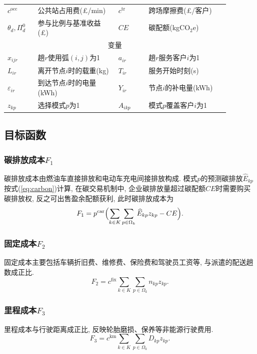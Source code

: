 \documentclass{setp-new}
\begin{document}
\begin{table}[H]
\begin{tabular}{@{}p{0.12\linewidth}p{0.32\linewidth}p{0.12\linewidth}p{0.32\linewidth}@{}}
$c^{\mathrm{occ}}$ & 公共站占用费(£/min) & $c^{\mathrm{tr}}$ & 跨场摩擦费(£/客户)\\
$\theta_d,\Pi_d^0$ & 参与比例与基准收益(£) & $CE$ & 碳配额(kgCO$_2$e)\\
\multicolumn{4}{c}{变量}\\
$x_{ijr}$ & 趟$r$使用弧$(i,j)$为1 & $a_{ir}$ & 趟$r$服务客户$i$为1\\
$L_{ir}$ & 离开节点$i$时的载重(kg) & $T_{ir}$ & 服务开始时刻(s)\\
$\varepsilon_{ir}$ & 到达节点$i$时的电量(kWh) & $Y_{ir}$ & 节点$i$的补电量(kWh)\\
$z_{kp}$ & 选择模式$p$为1 & $A_{ikp}$ & 模式$p$覆盖客户$i$为1\\
\bottomrule
\end{tabular}
\end{table}

\subsection{目标函数}

\subsubsection{碳排放成本$F_1$}
碳排放成本由燃油车直接排放和电动车充电间接排放构成.
模式$p$的预测碳排放$\widehat E_{kp}$按式(\ref{eq:carbon})计算,
在碳交易机制中, 企业碳排放量超过碳配额$CE$时需要购买碳排放权,
反之可出售盈余配额获利, 此时碳排放成本为
\begin{equation}
F_1=p^{\mathrm{car}}\Bigl(\sum_{k\in K}\sum_{p\in\Omega_k}\widehat E_{kp}z_{kp}-CE\Bigr).
\label{eq:F1}
\end{equation}

\subsubsection{固定成本$F_2$}
固定成本主要包括车辆折旧费、维修费、保险费和驾驶员工资等, 与派遣的配送趟数成正比.
\begin{equation}
F_2=c^{\mathrm{fix}}\sum_{k\in K}\sum_{p\in\Omega_k}n_{kp}z_{kp}.
\label{eq:F2}
\end{equation}

\subsubsection{里程成本$F_3$}
里程成本与行驶距离成正比, 反映轮胎磨损、保养等非能源行驶费用.
\begin{equation}
F_3=c^{\mathrm{km}}\sum_{k\in K}\sum_{p\in\Omega_k}D_{kp}z_{kp}.
\label{eq:F3}
\end{equation}
\end{document}
